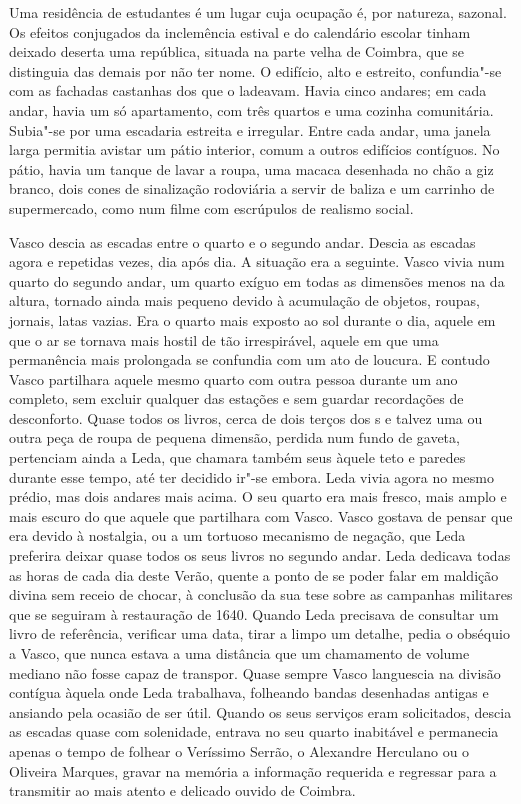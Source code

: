 Uma residência de estudantes é um lugar cuja ocupação é, por natureza,
sazonal. Os efeitos conjugados da inclemência estival e do calendário
escolar tinham deixado deserta uma república, situada na parte velha de
Coimbra, que se distinguia das demais por não ter nome. O edifício,
alto e estreito, confundia"-se com as fachadas castanhas dos que o
ladeavam. Havia cinco andares; em cada andar, havia um só apartamento,
com três quartos e uma cozinha comunitária. Subia"-se por uma escadaria
estreita e irregular. Entre cada andar, uma janela larga permitia
avistar um pátio interior, comum a outros edifícios contíguos. No pátio, havia um tanque de lavar a roupa,
uma macaca desenhada no chão a giz branco, dois cones de sinalização
rodoviária a servir de baliza e um carrinho de supermercado, como num
filme com escrúpulos de realismo social.

Vasco descia as escadas entre o quarto e o segundo andar. Descia as
escadas agora e repetidas vezes, dia após dia. A situação era a
seguinte. Vasco vivia num quarto do segundo andar, um quarto exíguo em
todas as dimensões menos na da altura, tornado ainda mais pequeno devido
à acumulação de objetos, roupas, jornais, latas vazias. Era o quarto
mais exposto ao sol durante o dia, aquele em que o ar se tornava mais
hostil de tão irrespirável, aquele em que uma permanência mais
prolongada se confundia com um ato de loucura. E contudo Vasco
partilhara aquele mesmo quarto com outra pessoa durante um ano completo,
sem excluir qualquer das estações e sem guardar recordações de
desconforto. Quase todos os livros, cerca de dois terços dos s e
talvez uma ou outra peça de roupa de pequena dimensão, perdida num fundo
de gaveta, pertenciam ainda a Leda, que chamara também seus àquele teto
e paredes durante esse tempo, até ter decidido ir"-se embora. Leda vivia
agora no mesmo prédio, mas dois andares mais acima. O seu quarto era
mais fresco, mais amplo e mais escuro do que aquele que partilhara com
Vasco. Vasco gostava de pensar que era devido à nostalgia, ou a um
tortuoso mecanismo de negação, que Leda preferira deixar quase todos os
seus livros no segundo andar. Leda dedicava todas as horas de cada dia
deste Verão, quente a ponto de se poder falar em maldição divina sem
receio de chocar, à conclusão da sua tese sobre as campanhas militares
que se seguiram à restauração de 1640. Quando Leda precisava de
consultar um livro de
referência, verificar uma data, tirar a limpo um detalhe, pedia o
obséquio a Vasco, que nunca estava a uma distância que um chamamento de
volume mediano não fosse capaz de transpor. Quase sempre Vasco
languescia na divisão contígua àquela onde Leda trabalhava, folheando
bandas desenhadas antigas e ansiando pela ocasião de ser útil. Quando os
seus serviços eram solicitados, descia as escadas quase com solenidade,
entrava no seu quarto inabitável e permanecia apenas o tempo de
folhear o Veríssimo Serrão, o Alexandre Herculano ou o Oliveira Marques,
gravar na memória a informação requerida e regressar para a transmitir
ao mais atento e delicado ouvido de Coimbra.


